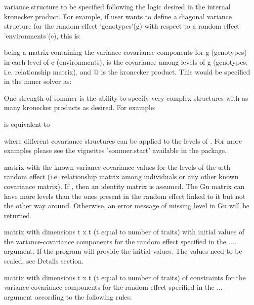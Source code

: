 \documentclass[a4paper]{book}
\begin{document}
\begin{Arguments}
\begin{ldescription}
\item[\code{...}] variance structure to be specified following the logic desired in the internal kronecker product. For example, if user wants to define a diagonal variance structure for the random effect 'genotypes'(g) with respect to a random effect 'environments'(e), this is:


being   a matrix containing the variance covariance components for g (genotypes) in each level of e (environments),  is the covariance among levels of g (genotypes; i.e. relationship matrix), and @ is the kronecker product. This would be specified in the mmer solver as:


One strength of sommer is the ability to specify very complex structures with as many kronecker products as desired. For example:


is equivalent to


where different covariance structures can be applied to the levels of . For more examples please see the vignettes 'sommer.start' available in the package.

\item[\code{Gu}] matrix with the known variance-covariance values for the levels of the u.th random effect (i.e. relationship matrix among individuals or any other known covariance matrix). If , then an identity matrix is assumed. The Gu matrix can have more levels than the ones present in the random effect linked to it but not the other way around. Otherwise, an error message of missing level in Gu will be returned.

\item[\code{Gti}] matrix with dimensions t x t (t equal to number of traits) with initial values of the variance-covariance components for the random effect specified in the .... argument. If  the program will provide the initial values. The values need to be scaled, see Details section.

\item[\code{Gtc}] matrix with dimensions t x t (t equal to number of traits) of constraints for the variance-covariance components for the random effect specified in the ... argument according to the following rules:


\end{ldescription}
\end{Arguments}
\end{document}
